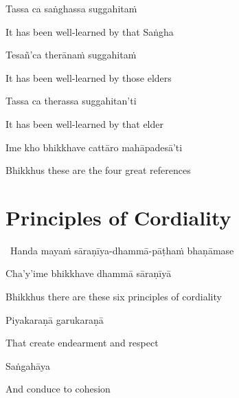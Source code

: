 Tassa ca saṅghassa suggahitaṁ

\begin{english}
  It has been well-learned by that Saṅgha
\end{english}

Tesañ'ca therānaṁ suggahitaṁ

\begin{english}
  It has been well-learned by those elders
\end{english}

Tassa ca therassa suggahitan'ti

\begin{english}
  It has been well-learned by that elder
\end{english}

Ime kho bhikkhave cattāro mahāpadesā'ti

\begin{english}
  Bhikkhus these are the four great references
\end{english}

\suttaRef{[AN 4.180]}

\ifdigital{}\fi



\section{Principles of Cordiality}
\label{principles-of-cordiality}

\begin{leader}
  \anglebracketleft\ \hspace{-0.5mm}Handa mayaṁ sāraṇīya-dhammā-pāṭhaṁ bhaṇāmase \hspace{-0.5mm}\anglebracketright\
\end{leader}

Cha'y'ime bhikkhave dhammā sāraṇīyā

\begin{english}
  Bhikkhus there are these six principles of cordiality
\end{english}

Piyakaraṇā garukaraṇā

\begin{english}
  That create endearment and respect
\end{english}

Saṅgahāya

\begin{english}
  And conduce to cohesion
\end{english}

